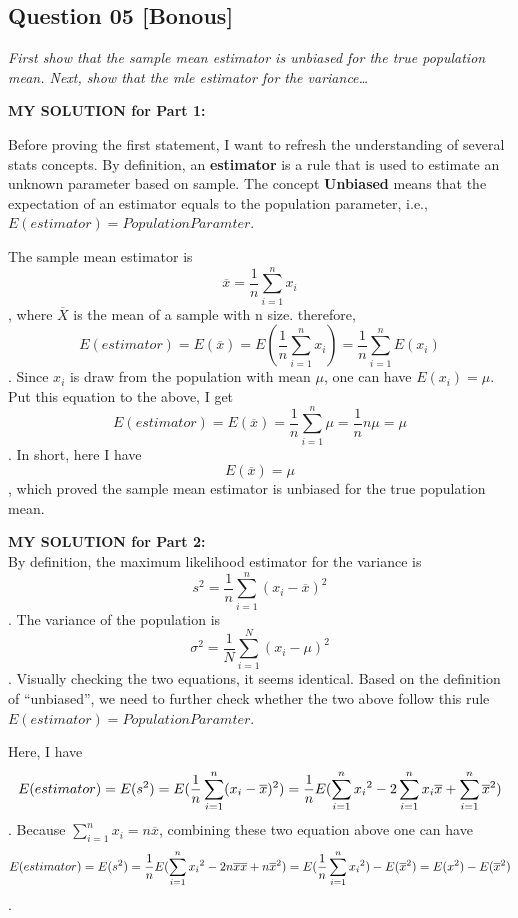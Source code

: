 \documentclass[
]{article}
\begin{document}
\hypertarget{question-05-bonous}{%
\subsection{Question 05 {[}Bonous{]}}\label{question-05-bonous}}

\emph{First show that the sample mean estimator is unbiased for the true
population mean. Next, show that the mle estimator for the
variance\ldots{}}

\textbf{MY SOLUTION for Part 1:}

Before proving the first statement, I want to refresh the understanding
of several stats concepts. By definition, an \textbf{estimator} is a
rule that is used to estimate an unknown parameter based on sample. The
concept \textbf{Unbiased} means that the expectation of an estimator
equals to the population parameter, i.e.,
\(E(estimator) = Population Paramter\).

The sample mean estimator is
\[\overline{x} = \frac{1}{n}\sum_{i = 1}^{n} x_{i}\], where
\(\overline{X}\) is the mean of a sample with n size. therefore,
\[E(estimator) = E(\overline{x})=E(\frac{1}{n}\sum_{i = 1}^{n} x_{i})= \frac{1}{n}\sum_{i = 1}^{n}E(x_i)\].
Since \(x_i\) is draw from the population with mean \(\mu\), one can
have \(E(x_i) = \mu\). Put this equation to the above, I get
\[E(estimator) = E(\overline{x}) = \frac{1}{n}\sum_{i = 1}^{n}\mu=\frac{1}{n}n\mu=\mu\].
In short, here I have \[E(\overline{x})= \mu\], which proved the sample
mean estimator is unbiased for the true population mean.

\textbf{MY SOLUTION for Part 2:}\\
By definition, the maximum likelihood estimator for the variance is
\[s^2=\frac{1}{n}\sum_{i = 1}^{n}(x_i-\overline{x})^2\]. The variance of
the population is \[\sigma^2=\frac{1}{N}\sum_{i = 1}^{N}(x_i-{\mu})^2\].
Visually checking the two equations, it seems identical. Based on the
definition of ``unbiased'', we need to further check whether the two
above follow this rule \(E(estimator) = Population Paramter\).

Here, I have
\[E(estimator) = E(s^2)=E(\frac{1}{n}\sum_{i = 1}^{n}(x_i-\overline{x})^2)=\\\frac{1}{n}E(\sum_{i = 1}^{n}{x_i}^2 - 2\sum_{i = 1}^{n}x_i\overline{x}+\sum_{i = 1}^{n}\overline{x}^2)\].
Because \(\sum_{i = 1}^{n}x_i = n\overline{x}\), combining these two
equation above one can have
\[E(estimator)=E(s^2)=\frac{1}{n}E(\sum_{i = 1}^{n}{x_i}^2 - 2n\overline{x}\overline{x}+n\overline{x}^2)=\\E(\frac{1}{n}\sum_{i = 1}^{n}{x_i}^2)-E(\overline{x}^2)=\\E(x^2)-E(\overline{x}^2)\].
\end{document}
